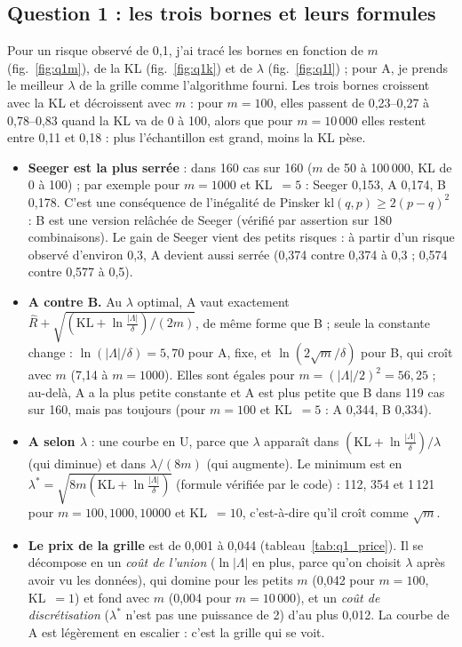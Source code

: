 \documentclass[11pt,a4paper]{article}
\newcommand{\KL}{\mathrm{KL}}
\newcommand{\Rh}{\widehat R}
\begin{document}
\subsection{Question 1 : les trois bornes et leurs formules}
Pour un risque observé de 0,1, j'ai tracé les bornes en fonction de $m$ (fig.~\ref{fig:q1m}), de la KL (fig.~\ref{fig:q1k}) et de $\lambda$ (fig.~\ref{fig:q1l}) ; pour A, je prends le meilleur $\lambda$ de la grille comme l'algorithme fourni. Les trois bornes croissent avec la KL et décroissent avec $m$ : pour $m=100$, elles passent de 0,23--0,27 à 0,78--0,83 quand la KL va de 0 à 100, alors que pour $m=10\,000$ elles restent entre 0,11 et 0,18 : plus l'échantillon est grand, moins la KL pèse.
\begin{itemize}
\item \textbf{Seeger est la plus serrée} : dans 160 cas sur 160 ($m$ de 50 à 100\,000, KL de 0 à 100) ; par exemple pour $m=1000$ et KL~$=5$ : Seeger 0,153, A 0,174, B 0,178. C'est une conséquence de l'inégalité de Pinsker $\mathrm{kl}(q,p)\ge 2(p-q)^2$ : B est une version relâchée de Seeger (vérifié par assertion sur 180 combinaisons). Le gain de Seeger vient des petits risques : à partir d'un risque observé d'environ 0,3, A devient aussi serrée (0,374 contre 0,374 à 0,3 ; 0,574 contre 0,577 à 0,5).
\item \textbf{A contre B.} Au $\lambda$ optimal, A vaut exactement $\Rh+\sqrt{(\KL+\ln\frac{|\Lambda|}{\delta})/(2m)}$, de même forme que B ; seule la constante change : $\ln(|\Lambda|/\delta)=5{,}70$ pour A, fixe, et $\ln(2\sqrt m/\delta)$ pour B, qui croît avec $m$ (7,14 à $m=1000$). Elles sont égales pour $m=(|\Lambda|/2)^2=56{,}25$ ; au-delà, A a la plus petite constante et A est plus petite que B dans 119 cas sur 160, mais pas toujours (pour $m=100$ et KL~$=5$ : A 0,344, B 0,334).
\item \textbf{A selon $\lambda$} : une courbe en U, parce que $\lambda$ apparaît dans $(\KL+\ln\frac{|\Lambda|}{\delta})/\lambda$ (qui diminue) et dans $\lambda/(8m)$ (qui augmente). Le minimum est en $\lambda^*=\sqrt{8m(\KL+\ln\frac{|\Lambda|}{\delta})}$ (formule vérifiée par le code) : 112, 354 et 1\,121 pour $m=100,1000,10000$ et KL~$=10$, c'est-à-dire qu'il croît comme $\sqrt m$.
\item \textbf{Le prix de la grille} est de 0,001 à 0,044 (tableau~\ref{tab:q1_price}). Il se décompose en un \emph{coût de l'union} ($\ln|\Lambda|$ en plus, parce qu'on choisit $\lambda$ après avoir vu les données), qui domine pour les petits $m$ (0,042 pour $m=100$, KL~$=1$) et fond avec $m$ (0,004 pour $m=10\,000$), et un \emph{coût de discrétisation} ($\lambda^*$ n'est pas une puissance de 2) d'au plus 0,012. La courbe de A est légèrement en escalier : c'est la grille qui se voit.
\end{itemize}
\end{document}
